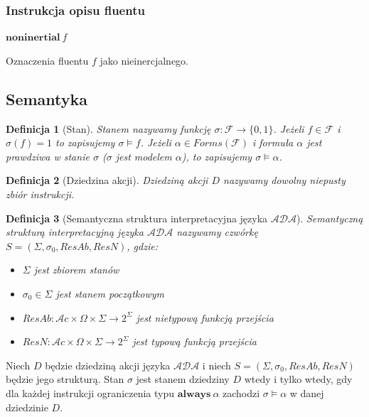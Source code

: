 \documentclass[11pt,a4paper]{article}
\newtheorem{definition}{Definicja}[section]
\begin{document}
    \subsubsection{Instrukcja opisu fluentu}
    \begin{center}
        $\mathbf{noninertial}~f$
    \end{center}
    Oznaczenia fluentu $f$ jako nieinercjalnego.
    
    \subsection{Semantyka}
    
    \begin{definition}[Stan]
    Stanem nazywamy funkcję $\sigma: \mathcal{F} \rightarrow \{0, 1\}$.
    Jeżeli $f \in \mathcal{F}$ i $\sigma(f)=1$ to zapisujemy $\sigma \models f$.
    Jeżeli $\alpha \in Forms(\mathcal{F})$ i formuła $\alpha$ jest prawdziwa w stanie $\sigma$ ($\sigma$ jest modelem $\alpha$), to zapisujemy $\sigma \models \alpha$.
    \end{definition}
    
    \begin{definition}[Dziedzina akcji]
    Dziedziną akcji $D$ nazywamy dowolny niepusty zbiór instrukcji.
    \end{definition}
    
    \begin{definition}[Semantyczna struktura interpretacyjna języka $\mathcal{ADA}$]
    Semantyczną strukturą interpretacyjną języka $\mathcal{ADA}$ nazywamy czwórkę $S=(\Sigma, \sigma_0, ResAb, ResN)$, gdzie:
    \begin{itemize}
        \item $\Sigma$ jest zbiorem stanów
        \item $\sigma_0 \in \Sigma$ jest stanem początkowym
        \item $ResAb: \mathcal{A}c \times \Omega \times \Sigma \rightarrow 2^\Sigma$ jest nietypową funkcją przejścia
        \item $ResN: \mathcal{A}c \times \Omega \times \Sigma \rightarrow 2^\Sigma$ jest typową funkcją przejścia
    \end{itemize}
    \end{definition}
    
    Niech $D$ będzie dziedziną akcji języka $\mathcal{ADA}$ i niech $S=(\Sigma, \sigma_0, ResAb, ResN)$ będzie jego strukturą. Stan $\sigma$ jest stanem dziedziny $D$ wtedy i tylko wtedy, gdy dla każdej instrukcji ograniczenia typu $\mathbf{always}~\alpha$ zachodzi $\sigma \models \alpha$ w danej dziedzinie $D$.
    
\end{document}
